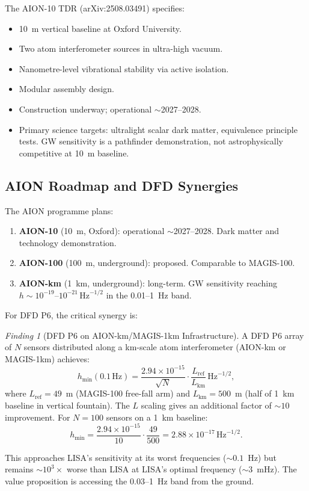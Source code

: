 \documentclass[11pt]{article}
\theoremstyle{definition}
\theoremstyle{remark}
\newtheorem{finding}[theorem]{Finding}
\newcommand{\ee}[1]{\times10^{#1}}
\newcommand{\sqrtHz}{\,\mathrm{Hz}^{-1/2}}
\begin{document}
The AION-10 TDR (arXiv:2508.03491) specifies:
\begin{itemize}[nosep]
\item 10~m vertical baseline at Oxford University.
\item Two atom interferometer sources in ultra-high vacuum.
\item Nanometre-level vibrational stability via active isolation.
\item Modular assembly design.
\item Construction underway; operational $\sim$2027--2028.
\item Primary science targets: ultralight scalar dark matter, equivalence
  principle tests. GW sensitivity is a pathfinder demonstration, not
  astrophysically competitive at 10~m baseline.
\end{itemize}

\subsection{AION Roadmap and DFD Synergies}

The AION programme plans:
\begin{enumerate}[nosep]
\item \textbf{AION-10} (10~m, Oxford): operational $\sim$2027--2028. Dark matter and
  technology demonstration.
\item \textbf{AION-100} (100~m, underground): proposed. Comparable to MAGIS-100.
\item \textbf{AION-km} (1~km, underground): long-term. GW sensitivity reaching
  $h \sim 10^{-19}$--$10^{-21}\sqrtHz$ in the 0.01--1~Hz band.
\end{enumerate}

For DFD P6, the critical synergy is:

\begin{finding}[DFD P6 on AION-km/MAGIS-1km Infrastructure]
\label{find:aion-km}
A DFD P6 array of $N$ sensors distributed along a km-scale atom
interferometer (AION-km or MAGIS-1km) achieves:
\begin{equation}
h_{\min}(0.1\,\mathrm{Hz}) = \frac{2.94\ee{-15}}{\sqrt{N}} \cdot
\frac{L_{\mathrm{ref}}}{L_{\mathrm{km}}} \sqrtHz,
\end{equation}
where $L_{\mathrm{ref}} = 49$~m (MAGIS-100 free-fall arm) and
$L_{\mathrm{km}} = 500$~m (half of 1~km baseline in vertical fountain).
The $L$ scaling gives an additional factor of $\sim 10$ improvement.
For $N = 100$ sensors on a 1~km baseline:
\begin{equation}
h_{\min} = \frac{2.94\ee{-15}}{10} \cdot \frac{49}{500}
= 2.88\ee{-17}\sqrtHz.
\end{equation}

This approaches LISA's sensitivity at its worst frequencies ($\sim 0.1$~Hz)
but remains $\sim 10^3\times$ worse than LISA at LISA's optimal frequency
($\sim 3$~mHz). The value proposition is accessing the 0.03--1~Hz band
from the ground.
\end{finding}
\end{document}
